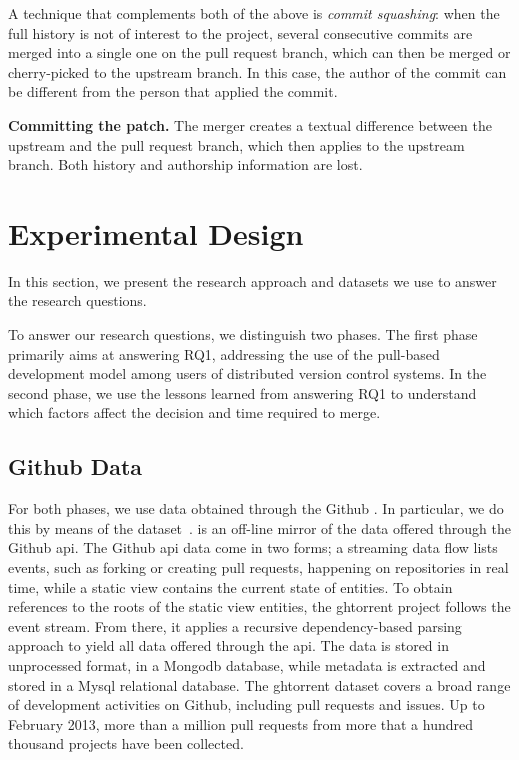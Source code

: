 \documentclass{sig-alternate}
\begin{document}
    A technique that complements both of the above is \emph{commit
    squashing}: when the full history is not of interest to the project,
    several consecutive commits are merged into a single one on the pull request
    branch, which can then be merged or cherry-picked to the upstream branch. In
    this case, the author of the commit can be different from the person that
    applied the commit.

    \textbf{Committing the patch.}
    The merger creates a
    textual difference between the upstream and the pull request branch, which
    then applies to the upstream branch. Both history and authorship information
    are lost.


\section{Experimental Design}

In this section, we present the research approach and datasets we use to 
answer the research questions.

To answer our research questions, we distinguish two phases.
The first phase primarily aims at answering RQ1, addressing the use of the pull-based development model among users
of distributed version control systems. 
In the second phase, we use the lessons learned from answering RQ1 to understand which factors affect the 
decision and time required to merge.

\subsection{Github Data}

For both phases, we use data obtained through the Github \api.
In particular, we do this by means of the \ghtorrent
dataset~\cite{GS12}.
%
\ghtorrent is  an off-line mirror of the data
offered through the Github {\sc api}. The Github {\sc api} 
data come in two forms; a streaming
data flow lists events, such as forking or creating pull requests, happening on
repositories in real time, while a static view contains the current state of
entities. To obtain references to the roots of the static view entities, the
{\sc ght}orrent project follows the event stream. From there, it applies a
recursive dependency-based parsing approach to yield all data offered through
the {\sc api}. The data is stored in unprocessed format, in a Mongo{\sc db}
database, while metadata is extracted and stored in a My{\sc sql} relational
database. The {\sc ght}orrent dataset covers a broad range of development
activities on Github, including pull requests and issues. Up to February 2013,
more than a million pull requests from more that a hundred thousand projects
have been collected.
\end{document}
